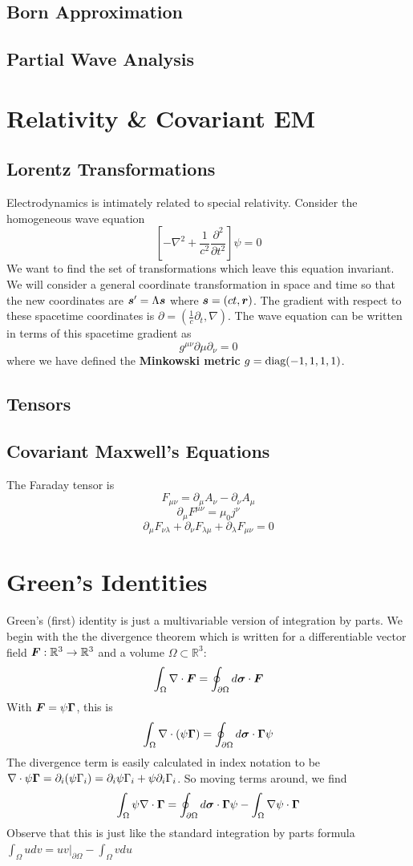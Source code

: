 \documentclass[twocolumn]{gwclass}
\newcommand{\R}{\mathbb{R}}
\begin{document}
	\subsection{Born Approximation}
	\subsection{Partial Wave Analysis}
	
	\section{Relativity \& Covariant EM}
	\subsection{Lorentz Transformations}
	Electrodynamics is intimately related to special relativity. Consider the homogeneous wave equation 
	$$ \left[-\nabla^2 + \frac{1}{c^2}\frac{\partial^2}{\partial t^2}\right]\psi = 0 $$
	We want to find the set of transformations which leave this equation invariant. We will consider a general coordinate transformation in space and time so that the new coordinates are $\boldsymbol{s}'=\Lambda\boldsymbol{s}$ where $\boldsymbol{s}=(ct,\boldsymbol{r})$. The gradient with respect to these spacetime coordinates is $\partial = (\frac{1}{c}\partial_t, \nabla)$. The wave equation can be written in terms of this spacetime gradient as 
	$$ g^{\mu\nu}\partial\mu \partial_\nu = 0 $$
	where we have defined the \textbf{Minkowski metric} $g = \text{\normalfont{diag}}(-1,1,1,1)$.
	\subsection{Tensors}
	\subsection{Covariant Maxwell's Equations}
	The Faraday tensor is 
	$$ F_{\mu\nu} = \partial_\mu A_\nu - \partial_\nu A_\mu $$
	$$ \partial_\mu F^{\mu\nu} = \mu_0 j^\nu $$
	$$ \partial_\mu F_{\nu\lambda} + \partial_\nu F_{\lambda\mu} + \partial_\lambda F_{\mu\nu}= 0 $$
	
	
	\newpage
	\appendix
	\section{Green's Identities}
	Green's (first) identity is just a multivariable version of integration by parts. We begin with the the divergence theorem which is written for a differentiable vector field $\*F:\R^3\to \R^3$ and a volume $\Omega\subset\R^3$:
	$$ \int_\Omega \nabla\cdot \boldsymbol{F} = \oint_{\partial\Omega}d\boldsymbol{\sigma}\cdot\boldsymbol{F} $$
	With $\boldsymbol{F}=\psi\boldsymbol{\Gamma}$, this is
	$$ \int_\Omega \nabla\cdot(\psi\boldsymbol{\Gamma}) = \oint_{\partial\Omega}d\boldsymbol{\sigma}\cdot\boldsymbol{\Gamma} \psi $$
	The divergence term is easily calculated in index notation to be $\nabla\cdot \psi\boldsymbol{\Gamma} = \partial_i(\psi \Gamma_i)= \partial_i\psi \Gamma_i + \psi \partial_i\Gamma_i$. So moving terms around, we find
	$$ \int_\Omega \psi \nabla\cdot\boldsymbol{\Gamma} = \oint_{\partial\Omega} d\boldsymbol{\sigma}\cdot\boldsymbol{\Gamma} \psi - \int_\Omega \nabla\psi\cdot\boldsymbol{\Gamma} $$
	Observe that this is just like the standard integration by parts formula $\int_\Omega udv = uv\big|_{\partial\Omega} - \int_\Omega vdu$
\end{document}
